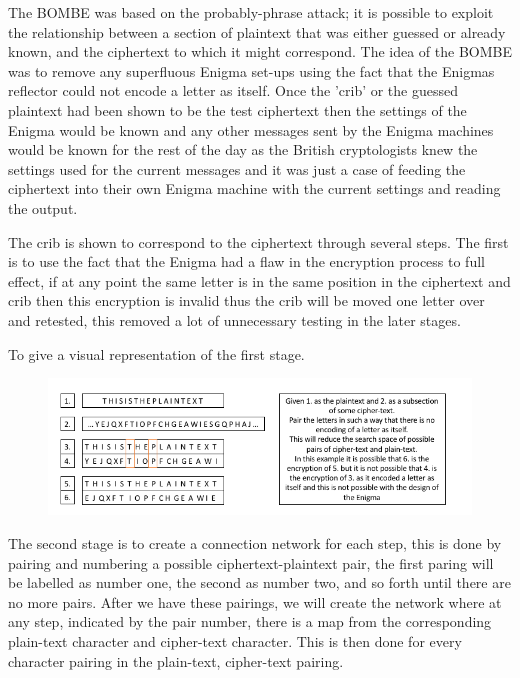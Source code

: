 \documentclass[12pt,a4paper]{article}
\begin{document}
The BOMBE was based on the probably-phrase attack; it is possible to exploit the relationship between a section of plaintext that was either guessed or already known, and the ciphertext to which it might correspond. The idea of the BOMBE was to remove any superfluous Enigma set-ups using the fact that the Enigmas reflector could not encode a letter as itself. Once the 'crib' or the guessed plaintext had been shown to be the test ciphertext then the settings of the Enigma would be known and any other messages sent by the Enigma machines would be known for the rest of the day as the British cryptologists knew the settings used for the current messages and it was just a case of feeding the ciphertext into their own Enigma machine with the current settings and reading the output.

The crib is shown to correspond to the ciphertext through several steps. The first is to use the fact that the Enigma had a flaw in the encryption process to full effect, if at any point the same letter is in the same position in the ciphertext and crib then this encryption is invalid thus the crib will be moved one letter over and retested, this removed a lot of unnecessary testing in the later stages. 

To give a visual representation of the first stage.

\begin{figure}[h]
\centering
\includegraphics[width=\textwidth]{StageOneBOMBE.png}
\end{figure}

The second stage is to create a connection network for each step, this is done by pairing and numbering a possible ciphertext-plaintext pair, the first paring will be labelled as number one, the second as number two, and so forth until there are no more pairs. After we have these pairings, we will create the network where at any step, indicated by the pair number, there is a map from the corresponding plain-text character and cipher-text character. This is then done for every character pairing in the plain-text, cipher-text pairing.
\end{document}
